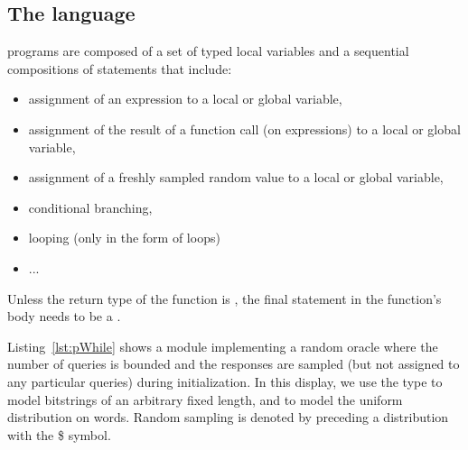 \subsection{The \pWHILE language}
\pWHILE programs are composed of a set of typed local variables and a
sequential compositions of statements that include:
\begin{itemize}\itemsep-.5em
\item assignment of an expression to a local or global variable,
\item assignment of the result of a function call (on expressions) to a local
  or global variable,
\item assignment of a freshly sampled random value to a local or global
  variable,
\item conditional branching,
\item looping (only in the form of  loops)
\item ... %
\end{itemize}
Unless the return type of the function is , the final statement in
the function's body needs to be a .

Listing~\ref{lst:pWhile} shows a module implementing a random oracle where the
number of queries is bounded and the responses are sampled (but not assigned to
any particular queries) during initialization. In this display, we use the type
 to model bitstrings of an arbitrary fixed length, and
 to model the uniform distribution on words. Random sampling is
denoted by preceding a distribution with the \textsf{\$} symbol.


